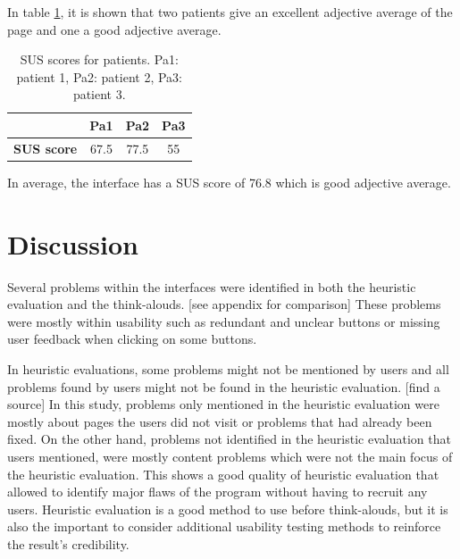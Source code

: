 \documentclass{sigchi}
\begin{document}
In table \ref{tab:PatientSUS}, it is shown that two patients give an excellent adjective average of the page and one a good adjective average.

\begin{table}[H]
    \centering
    \begin{tabular}{|c|c|c|c|}
    \hline
        & \textbf{Pa1} & \textbf{Pa2} & \textbf{Pa3}\\
    \hline
         \textbf{SUS score} & 67.5 & 77.5 & 55\\
    \hline
    \end{tabular}
    \caption{SUS scores for patients. Pa1: patient 1, Pa2: patient 2, Pa3: patient 3.}
    \label{tab:PatientSUS}
\end{table}

In average, the interface has a SUS score of 76.8 which is good adjective average.

\section{Discussion}
Several problems within the interfaces were identified in both the heuristic evaluation and the think-alouds. [see appendix for comparison] These problems were mostly within usability such as redundant and unclear buttons or missing user feedback when clicking on some buttons.

In heuristic evaluations, some problems might not be mentioned by users and all problems found by users might not be found in the heuristic evaluation. [find a source] In this study, problems only mentioned in the heuristic evaluation were mostly about pages the users did not visit or problems that had already been fixed. On the other hand, problems not identified in the heuristic evaluation that users mentioned, were mostly content problems which were not the main focus of the heuristic evaluation. This shows a good quality of heuristic evaluation that allowed to identify major flaws of the program without having to recruit any users. Heuristic evaluation is a good method to use before think-alouds, but it is also the important to consider additional usability testing methods to reinforce the result's credibility.
\end{document}

